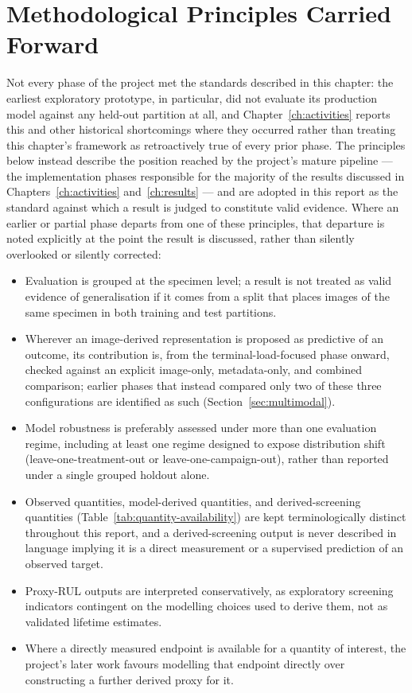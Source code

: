 \section{Methodological Principles Carried Forward}
\label{sec:principles}

Not every phase of the project met the standards described in this
chapter: the earliest exploratory prototype, in particular, did not
evaluate its production model against any held-out partition at all, and
Chapter~\ref{ch:activities} reports this and other historical shortcomings
where they occurred rather than treating this chapter's framework as
retroactively true of every prior phase. The principles below instead
describe the position reached by the project's mature pipeline — the
implementation phases responsible for the majority of the results
discussed in Chapters~\ref{ch:activities} and~\ref{ch:results} — and are
adopted in this report as the standard against which a result is judged to
constitute valid evidence. Where an earlier or partial phase departs from
one of these principles, that departure is noted explicitly at the point
the result is discussed, rather than silently overlooked or silently
corrected:

\begin{itemize}
\item Evaluation is grouped at the specimen level; a result is not treated
as valid evidence of generalisation if it comes from a split that places
images of the same specimen in both training and test partitions.
\item Wherever an image-derived representation is proposed as predictive
of an outcome, its contribution is, from the terminal-load-focused phase
onward, checked against an explicit image-only, metadata-only, and
combined comparison; earlier phases that instead compared only two of
these three configurations are identified as such (Section~\ref{sec:multimodal}).
\item Model robustness is preferably assessed under more than one
evaluation regime, including at least one regime designed to expose
distribution shift (leave-one-treatment-out or leave-one-campaign-out),
rather than reported under a single grouped holdout alone.
\item Observed quantities, model-derived quantities, and derived-screening
quantities (Table~\ref{tab:quantity-availability}) are kept terminologically
distinct throughout this report, and a derived-screening output is never
described in language implying it is a direct measurement or a supervised
prediction of an observed target.
\item Proxy-RUL outputs are interpreted conservatively, as exploratory
screening indicators contingent on the modelling choices used to derive
them, not as validated lifetime estimates.
\item Where a directly measured endpoint is available for a quantity of
interest, the project's later work favours modelling that endpoint
directly over constructing a further derived proxy for it.
\end{itemize}
